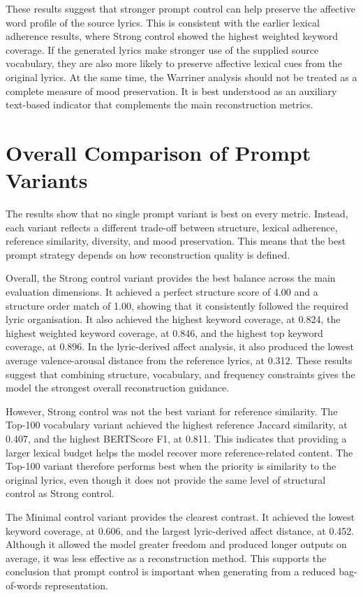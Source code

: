 These results suggest that stronger prompt control can help preserve the affective word profile of the source lyrics. This is consistent with the earlier lexical adherence results, where Strong control showed the highest weighted keyword coverage. If the generated lyrics make stronger use of the supplied source vocabulary, they are also more likely to preserve affective lexical cues from the original lyrics. At the same time, the Warriner analysis should not be treated as a complete measure of mood preservation. It is best understood as an auxiliary text-based indicator that complements the main reconstruction metrics.

\section{Overall Comparison of Prompt Variants}

The results show that no single prompt variant is best on every metric. Instead, each variant reflects a different trade-off between structure, lexical adherence, reference similarity, diversity, and mood preservation. This means that the best prompt strategy depends on how reconstruction quality is defined.

Overall, the Strong control variant provides the best balance across the main evaluation dimensions. It achieved a perfect structure score of 4.00 and a structure order match of 1.00, showing that it consistently followed the required lyric organisation. It also achieved the highest keyword coverage, at 0.824, the highest weighted keyword coverage, at 0.846, and the highest top keyword coverage, at 0.896. In the lyric-derived affect analysis, it also produced the lowest average valence-arousal distance from the reference lyrics, at 0.312. These results suggest that combining structure, vocabulary, and frequency constraints gives the model the strongest overall reconstruction guidance.

However, Strong control was not the best variant for reference similarity. The Top-100 vocabulary variant achieved the highest reference Jaccard similarity, at 0.407, and the highest BERTScore F1, at 0.811. This indicates that providing a larger lexical budget helps the model recover more reference-related content. The Top-100 variant therefore performs best when the priority is similarity to the original lyrics, even though it does not provide the same level of structural control as Strong control.

The Minimal control variant provides the clearest contrast. It achieved the lowest keyword coverage, at 0.606, and the largest lyric-derived affect distance, at 0.452. Although it allowed the model greater freedom and produced longer outputs on average, it was less effective as a reconstruction method. This supports the conclusion that prompt control is important when generating from a reduced bag-of-words representation.


